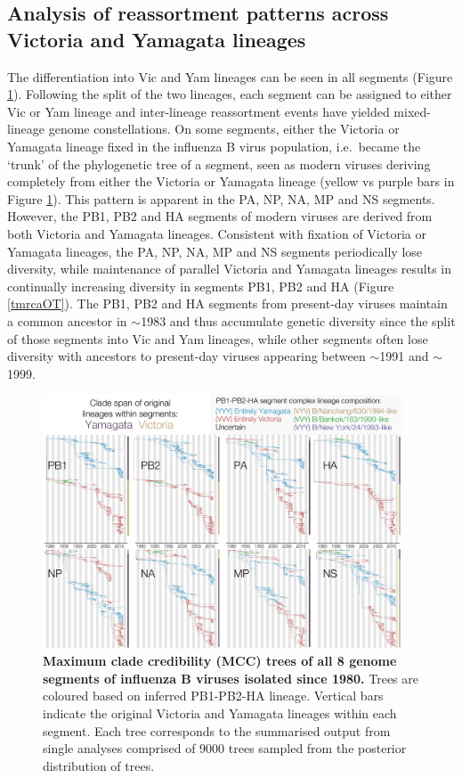 \documentclass[11pt,oneside,letterpaper]{article}
\begin{document}
\subsection*{Analysis of reassortment patterns across Victoria and Yamagata lineages}
The differentiation into Vic and Yam lineages can be seen in all segments (Figure \ref{genomeGrid}).
Following the split of the two lineages, each segment can be assigned to either Vic or Yam lineage and inter-lineage reassortment events have yielded mixed-lineage genome constellations.
On some segments, either the Victoria or Yamagata lineage fixed in the influenza B virus population, i.e.\ became the `trunk' of the phylogenetic tree of a segment, seen as modern viruses deriving completely from either the Victoria or Yamagata lineage (yellow vs purple bars in Figure \ref{genomeGrid}).
This pattern is apparent in the PA, NP, NA, MP and NS segments.
However, the PB1, PB2 and HA segments of modern viruses are derived from both Victoria and Yamagata lineages.
Consistent with fixation of Victoria or Yamagata lineages, the PA, NP, NA, MP and NS segments periodically lose diversity, while maintenance of parallel Victoria and Yamagata lineages results in continually increasing diversity in segments PB1, PB2 and HA (Figure \ref{tmrcaOT}).
The PB1, PB2 and HA segments from present-day viruses maintain a common ancestor in $\sim$1983 and thus accumulate genetic diversity since the split of those segments into Vic and Yam lineages, while other segments often lose diversity with ancestors to present-day viruses appearing between $\sim$1991 and $\sim$1999.

\begin{figure}[h]
\centering
\includegraphics[width=0.95\textwidth]{figures/InfB_genomeGrid.pdf}
\caption{\textbf{Maximum clade credibility (MCC) trees of all 8 genome segments of influenza B viruses isolated since 1980.}
Trees are coloured based on inferred PB1-PB2-HA lineage.
Vertical bars indicate the original Victoria and Yamagata lineages within each segment.
Each tree corresponds to the summarised output from single analyses comprised of 9000 trees sampled from the posterior distribution of trees.
}
\label{genomeGrid}
\end{figure}
\end{document}
